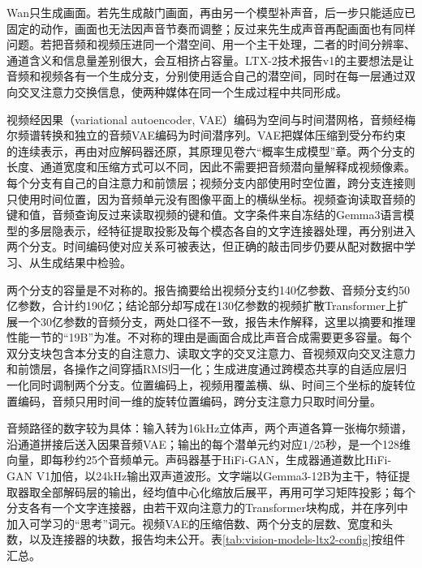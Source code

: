 Wan只生成画面。若先生成敲门画面，再由另一个模型补声音，后一步只能适应已固定的动作，画面也无法因声音节奏而调整；反过来先生成声音再配画面也有同样问题。若把音频和视频压进同一个潜空间、用一个主干处理，二者的时间分辨率、通道含义和信息量差别很大，会互相挤占容量。LTX-2技术报告v1的主要想法是让音频和视频各有一个生成分支，分别使用适合自己的潜空间，同时在每一层通过双向交叉注意力交换信息，使两种媒体在同一个生成过程中共同形成。

视频经因果（variational autoencoder, VAE）编码为空间与时间潜网格，音频经梅尔频谱转换和独立的音频VAE编码为时间潜序列。VAE把媒体压缩到受分布约束的连续表示，再由对应解码器还原，其原理见卷六“概率生成模型”章。两个分支的长度、通道宽度和压缩方式可以不同，因此不需要把音频潜向量解释成视频像素。每个分支有自己的自注意力和前馈层；视频分支内部使用时空位置，跨分支连接则只使用时间位置，因为音频单元没有图像平面上的横纵坐标。视频查询读取音频的键和值，音频查询反过来读取视频的键和值。文字条件来自冻结的Gemma3语言模型的多层隐表示，经特征提取投影及每个模态各自的文字连接器处理，再分别进入两个分支。时间编码使对应关系可被表达，但正确的敲击同步仍要从配对数据中学习、从生成结果中检验。

两个分支的容量是不对称的。报告摘要给出视频分支约140亿参数、音频分支约50亿参数，合计约190亿；结论部分却写成在130亿参数的视频扩散Transformer上扩展一个30亿参数的音频分支，两处口径不一致，报告未作解释，这里以摘要和推理性能一节的“19B”为准。不对称的理由是画面合成比声音合成需要更多容量。每个双分支块包含本分支的自注意力、读取文字的交叉注意力、音视频双向交叉注意力和前馈层，各操作之间穿插RMS归一化；生成进度通过跨模态共享的自适应层归一化同时调制两个分支。位置编码上，视频用覆盖横、纵、时间三个坐标的旋转位置编码，音频只用时间一维的旋转位置编码，跨分支注意力只取时间分量。

音频路径的数字较为具体：输入转为16kHz立体声，两个声道各算一张梅尔频谱，沿通道拼接后送入因果音频VAE；输出的每个潜单元约对应$1/25$秒，是一个128维向量，即每秒约25个音频单元。声码器基于HiFi-GAN，生成器通道数比HiFi-GAN V1加倍，以24kHz输出双声道波形。文字端以Gemma3-12B为主干，特征提取器取全部解码层的输出，经均值中心化缩放后展平，再用可学习矩阵投影；每个分支各有一个文字连接器，由若干双向注意力的Transformer块构成，并在序列中加入可学习的“思考”词元。视频VAE的压缩倍数、两个分支的层数、宽度和头数，以及连接器的块数，报告均未公开。表\ref{tab:vision-models-ltx2-config}按组件汇总。

